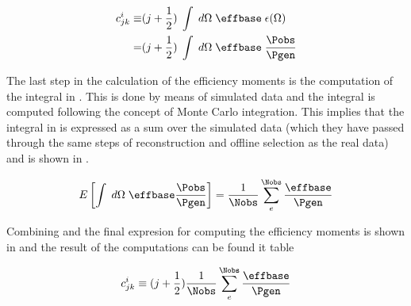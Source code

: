 \begin{center}
\begin{align}
   c^i_{jk}  \equiv &(j + \frac{1}{2}) \; \int \; d\Omega \; \effbase \; \epsilon(\Omega) \nonumber \\ 
                 = &(j + \frac{1}{2}) \; \int \; d\Omega \; \effbase \; \frac{\Pobs}{\Pgen}
  \label{eff_moms_def}
\end{align}
\end{center}

\noindent The last step in the calculation of the efficiency moments is the computation of the integral in .
This is done by means of simulated data and the integral is computed following the concept of Monte Carlo integration. This implies
that the integral in  is expressed as a sum over the simulated data (which they have passed through the same 
steps of reconstruction and offline selection as the real data) and is shown in .   

\begin{center}
\begin{equation}
  E\left[ \int \; d\Omega \; \effbase \frac{\Pobs}{\Pgen} \right] = \frac{1}{\Nobs} \sum_e^{\Nobs} \frac{\effbase}{\Pgen}  
  \label{eff_moms_calc}
\end{equation}
\end{center}

\noindent Combining  and  the final expresion for computing the efficiency moments is shown
in  and the result of the computations can be found it table   

\begin{center}
\begin{equation}
 c^i_{jk} \equiv (j + \frac{1}{2})  \frac{1}{\Nobs} \sum_e^{\Nobs} \frac{\effbase}{\Pgen}  
  \label{eff_moms_calc_final}
\end{equation}
\end{center}

